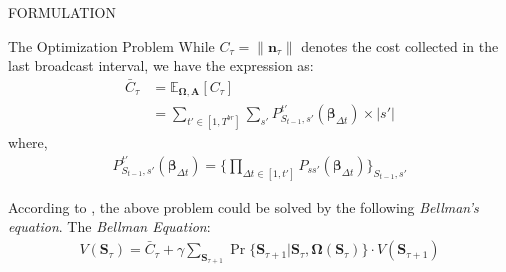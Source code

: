\documentclass[10pt, conference, letterpaper]{IEEEtran}
\renewcommand{\vec}{\mathbf}
\newcommand{\Stat}{\mathbf{S}}
\begin{document}
\begin{section}{FORMULATION}
\begin{subsection}{The Optimization Problem}
            While $C_{\tau} = \|\vec{n}_{\tau}\|$ denotes the cost collected in the last broadcast interval, we have the expression as:
            \begin{align}
                \bar{C}_\tau & = \mathbb{E}_{\vec{\Omega},\vec{A}}[C_\tau]
                \nonumber\\
                & = \sum_{t'\in[1,T^{br}]} \sum_{s'} P_{S_{t-1},s'}^{t'}(\vec{\beta}_{\Delta{t}}) \times |s'|
            \end{align}
            where,
            \begin{align}
                P_{S_{t-1},s'}^{t'}(\vec{\beta}_{\Delta{t}})
                = \{
                    \prod_{\Delta{t} \in [1,t']} P_{ss'}(\vec{\beta}_{\Delta{t}})
                \}_{S_{t-1}, s'}
            \end{align}

            According to \cite{sutton1998introduction}, the above problem could be solved by the following \emph{Bellman's equation}.
            The \emph{Bellman Equation}:
            \begin{align}
                V(\Stat_{\tau}) = \bar{C}_\tau + \gamma \sum_{\Stat_{\tau+1}} \Pr\{\Stat_{\tau+1}|\Stat_{\tau}, \vec{\Omega}(\Stat_\tau)\} \cdot V(\Stat_{\tau+1})
            \end{align}  
        \end{subsection}
    \end{section}
\end{document}
